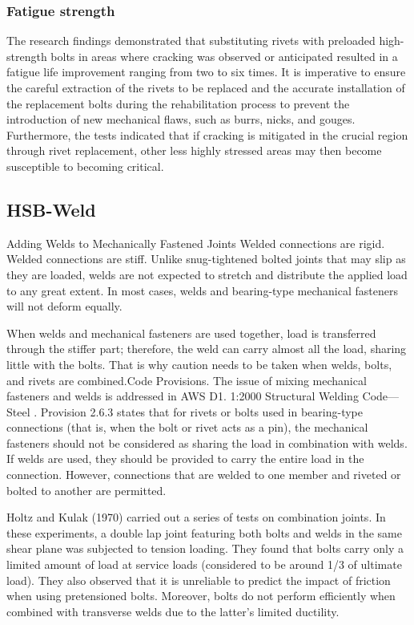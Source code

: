 \subsubsection{Fatigue strength}

The research findings \cite{steinhardt1969-hybrid, reemsnyder1975Fatigue} demonstrated that substituting rivets with preloaded high-strength bolts in areas where cracking was observed or anticipated resulted in a fatigue life improvement ranging from two to six times. It is imperative to ensure the careful extraction of the rivets to be replaced and the accurate installation of the replacement bolts during the rehabilitation process to prevent the introduction of new mechanical flaws, such as burrs, nicks, and gouges. Furthermore, the tests indicated that if cracking is mitigated in the crucial region through rivet replacement, other less highly stressed areas may then become susceptible to becoming critical.


\subsection{HSB-Weld} \label{sec-hsbweld}

Adding Welds to Mechanically Fastened Joints Welded connections are rigid. Welded connections are stiff. Unlike snug-tightened bolted joints that may slip as they are loaded, welds are not expected to stretch and distribute the applied load to any great extent. In most cases, welds and bearing-type mechanical fasteners will not deform equally.

When welds and mechanical fasteners are used together, load is transferred through the stiffer part; therefore, the weld can carry almost all the load, sharing little with the bolts. That is why caution needs to be taken when welds, bolts, and rivets are combined.Code Provisions. The issue of mixing mechanical fasteners and welds is addressed in AWS D1. 1:2000 Structural Welding Code—Steel \cite{aws2000AWS}. Provision 2.6.3 states that for rivets or bolts used in bearing-type connections (that is, when the bolt or rivet acts as a pin), the mechanical fasteners should not be considered as sharing the load in combination with welds. If welds are used, they should be provided to carry the entire load in the connection. However, connections that are welded to one member and riveted or bolted to another are permitted.


Holtz and Kulak (1970) \cite{holtz1970high} carried out a series of tests on combination joints. In these experiments, a double lap joint featuring both bolts and welds in the same shear plane was subjected to tension loading. They found that bolts carry only a limited amount of load at service loads (considered to be around 1/3 of ultimate load). They also observed that it is unreliable to predict the impact of friction when using pretensioned bolts. Moreover, bolts do not perform efficiently when combined with transverse welds due to the latter's limited ductility.



